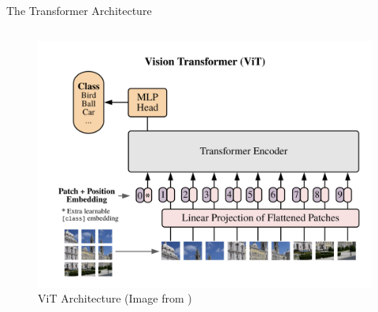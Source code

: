 \begin{frame}{The Transformer Architecture}
\begin{columns}
    \begin{figure}[t]
        \centering
        \includegraphics[width=\textwidth]{figures/transformer_paper/ViT_Original.png}
        \caption{ViT Architecture (Image from \textcite{dosovitskiy2020})
        \label{fig:ViT_orig}}
    \end{figure}
    \end{columns}
\end{frame}

